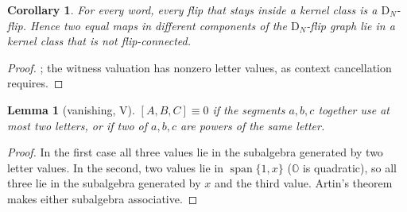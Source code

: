 \documentclass[11pt,a4paper]{article}
\newtheorem{lemma}[thm]{Lemma}
\newtheorem{corollary}[thm]{Corollary}
\theoremstyle{definition}
\theoremstyle{remark}
\newcommand{\OO}{\mathbb{O}}
\newcommand{\assoc}[3]{[#1,#2,#3]}
\newcommand{\DN}{\mathrm{D}_N}
\begin{document}
\begin{corollary}\label{cor:Wflip}
For every word, every flip that stays inside a kernel class is a $\DN$-flip. Hence two equal maps in
different components of the $\DN$-flip graph lie in a kernel class that is not flip-connected.
\end{corollary}
\begin{proof}
; the witness valuation has nonzero letter values, as context cancellation requires.
\end{proof}

\begin{lemma}[vanishing, V]\label{lem:V}
$\assoc ABC\equiv0$ if the segments $a,b,c$ together use at most two letters, or if two of $a,b,c$ are
powers of the same letter.
\end{lemma}
\begin{proof}
In the first case all three values lie in the subalgebra generated by two letter values. In the second,
two values lie in $\operatorname{span}\{1,x\}$ ($\OO$ is quadratic), so all three lie in the subalgebra
generated by $x$ and the third value. Artin's theorem makes either subalgebra associative.
\end{proof}
\end{document}
